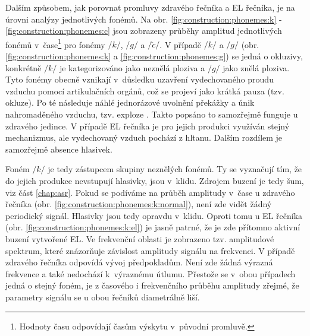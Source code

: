 Dalším způsobem, jak porovnat promluvy zdravého řečníka  a EL řečníka, je na úrovni analýzy jednotlivých fonémů.
Na obr. \ref{fig:construction:phonemes:k} - \ref{fig:construction:phonemes:c} jsou zobrazeny průběhy amplitud jednotlivých fonémů v~čase\footnote{Hodnoty času odpovídají časům výskytu v~původní promluvě.} pro fonémy $/k/$, $/g/$ a $/\check{c}/$.
V případě $/k/$ a $/g/$ (obr. \ref{fig:construction:phonemes:k} a \ref{fig:construction:phonemes:g}) se jedná o okluzivy, konkrétně $/k/$ je kategorizováno jako neznělá ploziva a $/g/$ jako znělá ploziva.
Tyto fonémy obecně vznikají v~důsledku uzavření vydechovaného proudu vzduchu pomocí artikulačních orgánů, což se projeví jako krátká pauza (tzv. okluze).
Po té následuje náhlé jednorázové uvolnění překážky a únik nahromaděného vzduchu, tzv. exploze \cite{Psutka2006}.
Takto popsáno to samozřejmě funguje u zdravého jedince.
V případě EL řečníka je pro jejich produkci využíván stejný mechanizmus, ale vydechovaný vzduch pochází z hltanu.
Dalším rozdílem je samozřejmě absence hlasivek.

Foném $/k/$ je tedy zástupcem skupiny neznělých fonémů.
Ty se vyznačují tím, že do jejich produkce nevstupují hlasivky, jsou v~klidu.
Zdrojem buzení je tedy šum, viz část \ref{chap:asr}.
Pokud se podíváme na průběh amplitudy v~čase u zdravého řečníka (obr. \ref{fig:construction:phonemes:k:normal}), není zde vidět žádný periodický signál.
Hlasivky jsou tedy opravdu v~klidu.
Oproti tomu u EL řečníka (obr. \ref{fig:construction:phonemes:k:el}) je jasně patrné, že je zde přítomno aktivní buzení vytvořené EL.
Ve frekvenční oblasti je zobrazeno tzv. amplitudové spektrum, které znázorňuje závislost amplitudy signálu na frekvenci.
V případě zdravého řečníka odpovídá vývoj předpokladům.
Není zde žádná výrazná frekvence a také nedochází k~výraznému útlumu.
Přestože se v~obou případech jedná o stejný foném, je z časového i frekvenčního průběhu amplitudy zřejmé, že parametry signálu se u obou řečníků diametrálně liší.

